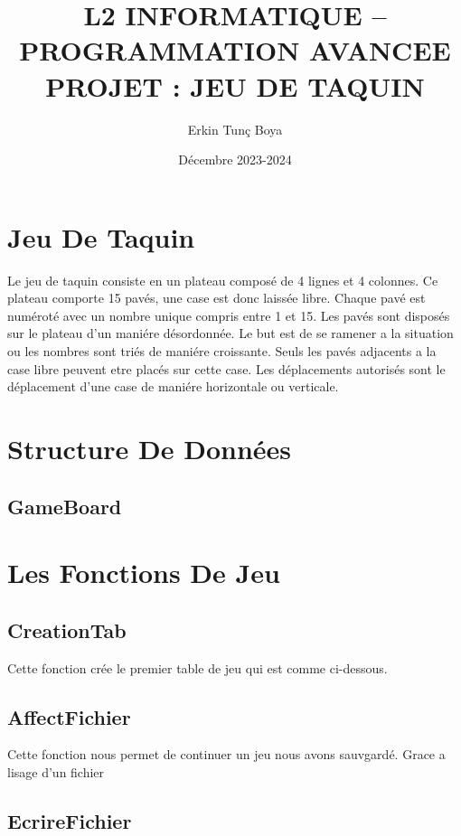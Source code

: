 \documentclass{article}
\title{L2 INFORMATIQUE – PROGRAMMATION AVANCEE \\ PROJET : JEU DE TAQUIN}
\author{Erkin Tunç Boya}
\date{Décembre 2023-2024}
\begin{document}
\maketitle
\tableofcontents
\newpage


\section{Jeu De Taquin}
Le jeu de taquin consiste en un
plateau composé de 4 lignes et 4 colonnes. Ce plateau comporte 15 pavés, une case est donc
laissée libre. Chaque pavé est numéroté avec un nombre unique compris entre 1 et 15.
Les pavés sont disposés sur le plateau d’un maniére désordonnée. Le but est de se ramener a la
situation ou les nombres sont triés de maniére croissante. Seuls les pavés adjacents a la case libre
peuvent etre placés sur cette case. Les déplacements autorisés sont le déplacement d’une case de
maniére horizontale ou verticale.


\section{Structure De Données}

\subsection{GameBoard}


\section{Les Fonctions De Jeu}

\subsection{CreationTab}
Cette fonction crée le premier table de jeu qui est comme ci-dessous.


\subsection{AffectFichier}
Cette fonction nous permet de continuer un jeu nous avons sauvgardé. Grace a lisage d'un fichier

\subsection{EcrireFichier}
\end{document}
